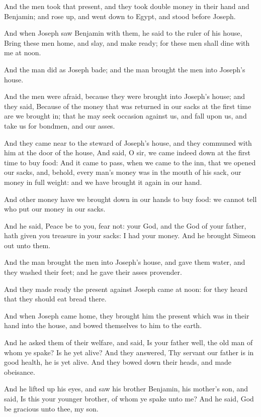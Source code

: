 \verse And the men took that present, and they took double money in
their hand and Benjamin; and rose up, and went down to Egypt, and
stood before Joseph.

\verse And when Joseph saw Benjamin with them, he said to the ruler of
his house, Bring these men home, and slay, and make ready; for these
men shall dine with me at noon.

\verse And the man did as Joseph bade; and the man brought the men into
Joseph's house.

\verse And the men were afraid, because they were brought into Joseph's
house; and they said, Because of the money that was returned in our
sacks at the first time are we brought in; that he may seek occasion
against us, and fall upon us, and take us for bondmen, and our asses.

\verse And they came near to the steward of Joseph's house, and they
communed with him at the door of the house, \verse And said, O sir, we
came indeed down at the first time to buy food: \verse And it came to
pass, when we came to the inn, that we opened our sacks, and, behold,
every man's money was in the mouth of his sack, our money in full
weight: and we have brought it again in our hand.

\verse And other money have we brought down in our hands to buy food:
we cannot tell who put our money in our sacks.

\verse And he said, Peace be to you, fear not: your God, and the God of
your father, hath given you treasure in your sacks: I had your money.
And he brought Simeon out unto them.

\verse And the man brought the men into Joseph's house, and gave them
water, and they washed their feet; and he gave their asses provender.

\verse And they made ready the present against Joseph came at noon: for
they heard that they should eat bread there.

\verse And when Joseph came home, they brought him the present which
was in their hand into the house, and bowed themselves to him to the
earth.

\verse And he asked them of their welfare, and said, Is your father
well, the old man of whom ye spake? Is he yet alive?  \verse And they
answered, Thy servant our father is in good health, he is yet alive.
And they bowed down their heads, and made obeisance.

\verse And he lifted up his eyes, and saw his brother Benjamin, his
mother's son, and said, Is this your younger brother, of whom ye spake
unto me? And he said, God be gracious unto thee, my son.


